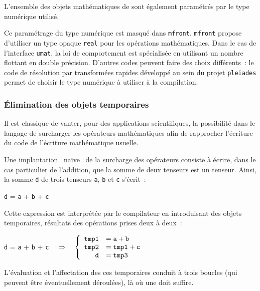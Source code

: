 \documentclass[rectoverso,pleiades,pstricks,leqno,anti]{texmf/note_technique_2010}
\newcommand{\pleiades}{\texttt{pleiades}}
\newcommand{\mfront}{\texttt{mfront}}
\newcommand{\tfel}[1]{\index{tfel}{#1}{\texttt{#1}}}
\def\ifmonospace{\ifdim\fontdimen3\font=0pt }
\def\cpp{%
\ifmonospace%
    C++%
\else%
    C\kern-.1667em\raise.30ex\hbox{\smaller{++}}%
\fi%
\spacefactor1000 }
\begin{document}
L'ensemble des objets mathématiques de \tfel{} sont également
paramétrés par le type numérique utilisé. 

Ce paramétrage du type numérique est masqué dans \mfront{}. \mfront{}
propose d'utiliser un type opaque \texttt{real} pour les opérations
mathématiques. Dans le cas de l'interface \texttt{umat}, la loi de
comportement est spécialisée en utilisant un nombre flottant en double
précision. D'autres codes peuvent faire des choix différents~: le code
de résolution par transformées rapides développé au sein du projet
\pleiades{} permet de choisir le type numérique à utiliser à la
compilation.

\subsubsection{Élimination des objets temporaires}

Il est classique de vanter, pour des applications scientifiques, la
possibilité dans le langage \cpp{} de surcharger les opérateurs
mathématiques afin de rapprocher l'écriture du code de l'écriture
mathématique usuelle.

Une implantation \og~naïve~\fg{} de la surcharge des opérateurs
consiste à écrire, dans le cas particulier de l'addition, que la somme
de deux tenseurs est un tenseur. Ainsi, la somme \texttt{d} de trois
tenseurs \texttt{a}, \texttt{b} et \texttt{c} s'écrit~:
\begin{center}
  \texttt{d} =  \texttt{a} + \texttt{b} + \texttt{c}
\end{center}
Cette expression est interprétée par le compilateur en introduisant
des objets temporaires, résultats des opérations prises deux à deux~:
\begin{center}
  \texttt{d} =  \texttt{a} + \texttt{b} + \texttt{c}
  \(\quad\Rightarrow\quad
  \left\{
      \begin{array}[p]{rl}
        \text{\texttt{tmp1}} &= \text{\texttt{a}}    + \text{\texttt{b}} \\ 
        \text{\texttt{tmp2}} &= \text{\texttt{tmp1}} + \text{\texttt{c}} \\ 
        \text{\texttt{d}}    &= \text{\texttt{tmp3}}
      \end{array}
    \right.
    \)
\end{center}

L'évaluation et l'affectation des ces temporaires conduit à trois
boucles (qui peuvent être éventuellement déroulées), là où une doit
suffire.
\end{document}
